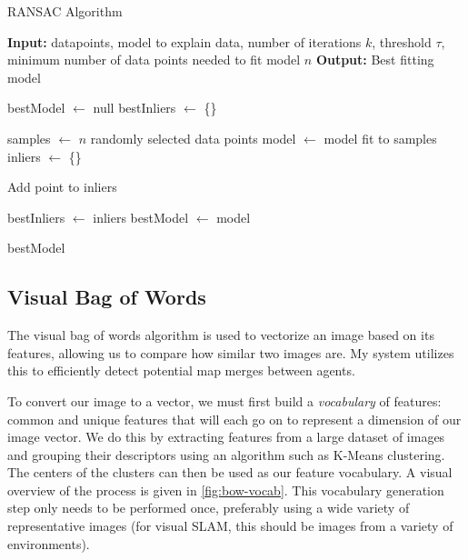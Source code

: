 \begin{algorithm}[h]
    \caption{RANSAC Algorithm}
    \label{alg:ransac}
    \begin{algorithmic}[1]
        \State \textbf{Input:} datapoints, model to explain data, number of iterations $k$, threshold $\tau$, minimum number of data points needed to fit model $n$
        \State \textbf{Output:} Best fitting model

        \State bestModel $\leftarrow$ null
        \State bestInliers $\leftarrow$ \{\}

        \State samples $\leftarrow$ $n$ randomly selected data points
        \State model $\leftarrow$ model fit to samples
        \State inliers $\leftarrow$ \{\}

        \State Add point to inliers
        \EndIf
        \EndFor

        \State bestInliers $\leftarrow$ inliers
        \State bestModel $\leftarrow$ model
        \EndIf
        \EndFor

        \State \Return bestModel
    \end{algorithmic}
\end{algorithm}

\subsection{Visual Bag of Words}
\label{sec:visual-bag-of-words}
The visual bag of words algorithm is used to vectorize an image based on its features, allowing us to compare how similar two images are. My system utilizes this to efficiently detect potential map merges between agents.

To convert our image to a vector, we must first build a \textit{vocabulary} of features: common and unique features that will each go on to represent a dimension of our image vector. We do this by extracting features from a large dataset of images and grouping their descriptors using an algorithm such as K-Means clustering. The centers of the clusters can then be used as our feature vocabulary. A visual overview of the process is given in \autoref{fig:bow-vocab}. This vocabulary generation step only needs to be performed once, preferably using a wide variety of representative images (for visual SLAM, this should be images from a variety of environments).

